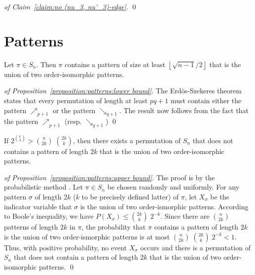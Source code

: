 \documentclass[a4paper,10pt]{llncs}
\begin{document}
\begin{proof}[of Claim~\ref{claim:no (nu_3, nu'_3)-edge}]
  \qed
\end{proof}


\section{Patterns}
\label{section:Patterns}

\begin{proposition}
  \label{proposition:patterns:lower bound}
  Let $\pi \in S_{n}$.
  Then $\pi$ contains a pattern of size at least
  $\left\lfloor\sqrt{n-1}/2\right\rfloor$ that
  is the union of two order-isomorphic patterns.
\end{proposition}

\begin{proof}[of Proposition~\ref{proposition:patterns:lower bound}]
  The Erdös-Szekeres theorem \cite{Erdos:Szekeres:1935}
  states that every permutation of
  length at least $pq+1$ must contain either the pattern
  $\nearrow_{p+1}$ or the pattern $\searrow_{q+1}$.
  The result now follows from the fact that
  the pattern $\nearrow_{p+1}$ (resp. $\searrow_{q+1}$)
\qed
\end{proof}

\begin{proposition}
  \label{proposition:patterns:upper bound}
  If $2^{\binom{k}{2}} > \binom{n}{2k}\;\binom{2k}{k}$, then there exists
  a permutation of $S_{n}$
  that does not contains a pattern
  of length $2k$ that is the union of two
  order-isomorphic patterns.
\end{proposition}

\begin{proof}[of Proposition~\ref{proposition:patterns:upper bound}]
The proof is by the probabilistic method \cite{Alon:Spencer:1992}.
Let $\pi \in S_n$ be chosen randomly and uniformly.
For any pattern $\sigma$ of length $2k$ ($k$ to be precisely defined latter)
of $\pi$,
let $X_\sigma$ be the indicator variable that
$\sigma$ is the union of two order-ismorphic patterns.
According to Boole's inequality, we have
$P\left(X_\sigma\right) \leq \binom{2k}{k}\;2^{-k}$.
Since there are $\binom{n}{2k}$ patterns of length $2k$ in $\pi$,
the probability that $\pi$ contains a pattern of length $2k$
is the union of two order-ismorphic patterns is at most
$\binom{n}{2k}\;\binom{2k}{k}\;2^{-k} < 1$.
Thus, with positive probability, no event $X_\sigma$ occurs and
there is a permutation of $S_n$ that does not contain a pattern
of length $2k$ that is the union of two order-isomorphic patterns.
\qed
\end{proof}
\end{document}
